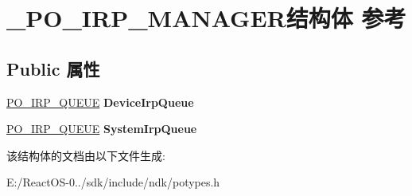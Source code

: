 \hypertarget{struct___p_o___i_r_p___m_a_n_a_g_e_r}{}\section{\+\_\+\+P\+O\+\_\+\+I\+R\+P\+\_\+\+M\+A\+N\+A\+G\+E\+R结构体 参考}
\label{struct___p_o___i_r_p___m_a_n_a_g_e_r}
\subsection*{Public 属性}
\begin{DoxyCompactItemize}
\item 
\mbox{\label{struct___p_o___i_r_p___m_a_n_a_g_e_r_a2f3a1793751b34bc4fac721e66486569}} 
\hyperlink{struct___p_o___i_r_p___q_u_e_u_e}{P\+O\+\_\+\+I\+R\+P\+\_\+\+Q\+U\+E\+UE} {\bfseries Device\+Irp\+Queue}
\item 
\mbox{\label{struct___p_o___i_r_p___m_a_n_a_g_e_r_a6c59817760a0fc0d13e9bed1d92f0ed5}} 
\hyperlink{struct___p_o___i_r_p___q_u_e_u_e}{P\+O\+\_\+\+I\+R\+P\+\_\+\+Q\+U\+E\+UE} {\bfseries System\+Irp\+Queue}
\end{DoxyCompactItemize}


该结构体的文档由以下文件生成\+:\begin{DoxyCompactItemize}
\item 
E\+:/\+React\+O\+S-\/0../sdk/include/ndk/potypes.\+h\end{DoxyCompactItemize}
